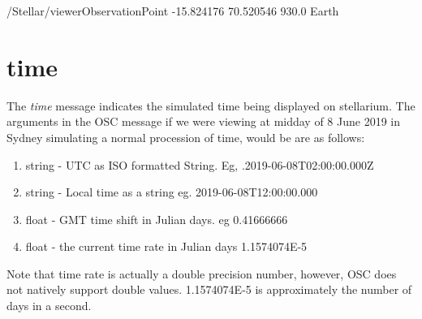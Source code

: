 \begin{syntax}
	/Stellar/viewerObservationPoint -15.824176 70.520546 930.0 Earth
\end{syntax}

\section{time}
The \textit{time} message indicates the simulated time being displayed on stellarium. The arguments in the OSC message if we were viewing at midday of 8 June 2019 in Sydney simulating a normal procession of time, would be are as follows:
\begin{enumerate}
	\item string - UTC as ISO formatted String. Eg, .2019-06-08T02:00:00.000Z
	\item string - Local time as a string eg. 2019-06-08T12:00:00.000
	\item float - GMT time shift in Julian days. eg 0.41666666
	\item float - the current time rate in Julian days 1.1574074E-5
\end{enumerate}

Note that time rate is actually a double precision number, however, OSC does not natively support double values. 1.1574074E-5 is approximately the number of days in a second.
